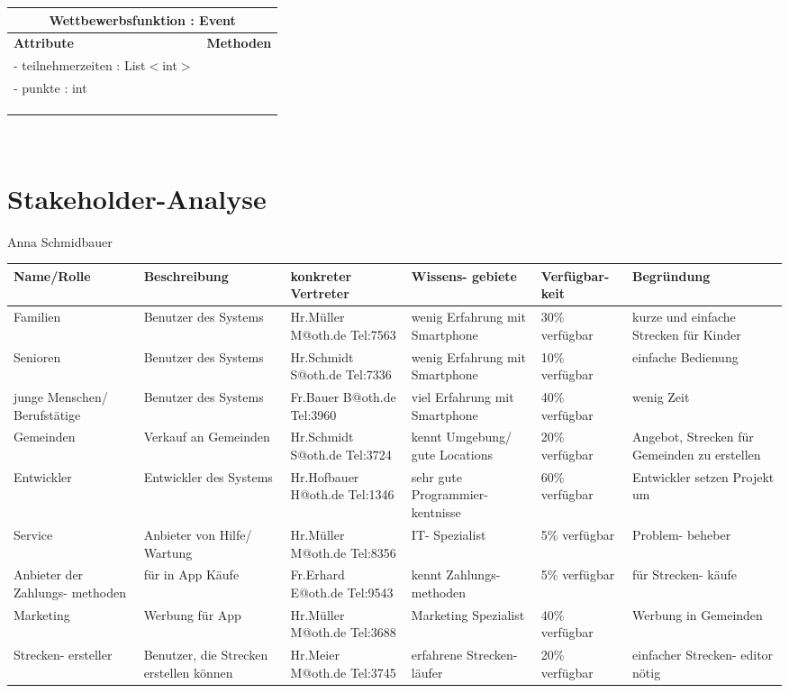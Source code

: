 \documentclass[a4paper, 12pt]{article}
\begin{document}
\begin{tabular}{ | p{5.5cm} | p{8cm} |}
\multicolumn{2}{c}{\textbf{Wettbewerbsfunktion : Event}}\\ \hline
\textbf{Attribute} & \textbf{Methoden} \\ \hline
- teilnehmerzeiten : List$<$int$>$ &  \\ \hline
- punkte : int &  \\ \hline
 &  \\ \hline
 &  \\ \hline
 &  \\ \hline
\end{tabular}\\[1\baselineskip]
\section{Stakeholder-Analyse}Anna Schmidbauer\\
\begin{center}
\begin{tabular}{|p{2cm}|p{2cm}|p{2cm}|p{2cm}|p{2cm}|p{2cm}|}
\hline
Name/Rolle & Beschreibung & konkreter Vertreter & Wissens- gebiete & Verfügbar- keit & Begründung\\ \hline
Familien & Benutzer des Systems & Hr.Müller M@oth.de Tel:7563& wenig Erfahrung mit Smartphone & 30\% verfügbar & kurze und einfache Strecken für Kinder\\ \hline
Senioren & Benutzer des Systems & Hr.Schmidt S@oth.de Tel:7336 & wenig Erfahrung mit Smartphone & 10\% verfügbar & einfache Bedienung\\ \hline
junge Menschen/ Berufstätige & Benutzer des Systems & Fr.Bauer B@oth.de Tel:3960& viel Erfahrung mit Smartphone & 40\% verfügbar & wenig Zeit\\ \hline
Gemeinden & Verkauf an Gemeinden & Hr.Schmidt S@oth.de Tel:3724& kennt Umgebung/ gute Locations & 20\% verfügbar & Angebot, Strecken für Gemeinden zu erstellen\\ \hline
Entwickler & Entwickler des Systems & Hr.Hofbauer H@oth.de Tel:1346& sehr gute Programmier- kentnisse & 60\% verfügbar & Entwickler setzen Projekt um\\ \hline
Service & Anbieter von Hilfe/ Wartung & Hr.Müller M@oth.de Tel:8356& IT- Spezialist & 5\% verfügbar & Problem- beheber\\ \hline
Anbieter der Zahlungs- methoden & für in App Käufe & Fr.Erhard E@oth.de Tel:9543 & kennt Zahlungs- methoden & 5\% verfügbar & für Strecken- käufe\\ \hline
Marketing & Werbung für App & Hr.Müller M@oth.de Tel:3688 & Marketing Spezialist & 40\% verfügbar & Werbung in Gemeinden\\ \hline
Strecken- ersteller & Benutzer, die Strecken erstellen können & Hr.Meier M@oth.de Tel:3745& erfahrene Strecken- läufer & 20\% verfügbar & einfacher Strecken- editor nötig\\ \hline
\hline

\end{tabular}
\end{center}
\end{document}
